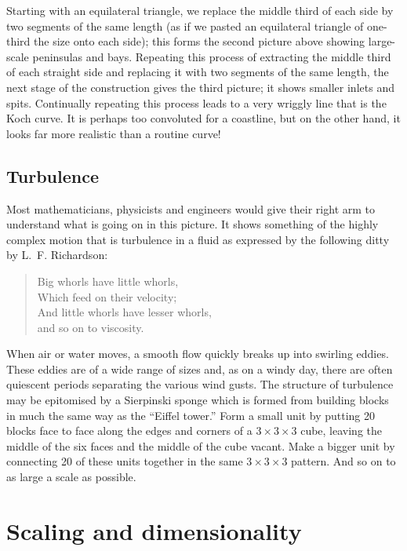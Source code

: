 \documentclass[12pt,a5paper]{article}
\begin{document}
Starting with an equilateral triangle, we replace the middle third of 
each side by two segments of the same length (as if we pasted an 
equilateral triangle of one-third the size onto each side); this 
forms the second picture above showing large-scale peninsulas and 
bays.  Repeating this process of extracting the middle third of each 
straight side and replacing it with two segments of the same length, 
the next stage of the construction gives the third picture; it shows 
smaller inlets and spits.  Continually repeating this process leads 
to a very wriggly line that is the Koch curve.  It is perhaps too 
convoluted for a coastline, but on the other hand, it looks far more 
realistic than a routine curve!

\subsection{Turbulence}

Most mathematicians, physicists and engineers would give their right 
arm to understand what is going on in this picture.  It shows 
something of the highly complex motion that is turbulence in a fluid 
as expressed by the following ditty by L.~F. Richardson:
\begin{verse}
	Big whorls have little whorls,\\
	Which feed on their velocity;\\
	And little whorls have lesser whorls,\\
	and so on to viscosity.
\end{verse}

When air or water moves, a smooth flow quickly breaks up into 
swirling eddies.  These eddies are of a wide range of sizes and, as 
on a windy day, there are often quiescent periods separating the 
various wind gusts.  The structure of turbulence may be epitomised by 
a Sierpinski sponge which is formed from building blocks in much the 
same way as the ``Eiffel tower.''  Form a small unit by putting 20 
blocks face to face along the edges and corners of a $3\times 
3\times 3$ cube, 
leaving the middle of the six faces and the middle of the cube 
vacant.  Make a bigger unit by connecting 20 of these units together 
in the same 
\(
	3\times 3\times 3
\)
 pattern.  And so on to as large a scale as possible.

\section{Scaling and dimensionality}
\end{document}
